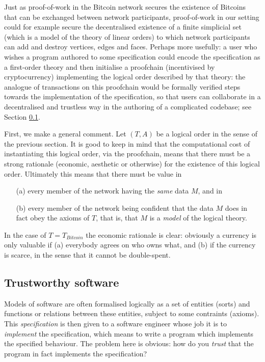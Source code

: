 \documentclass[english,letter paper,12pt,reqno]{article}
\theoremstyle{example}
\begin{document}
Just as proof-of-work in the Bitcoin network secures the existence of Bitcoins that can be exchanged between network participants, proof-of-work in our setting could for example secure the decentralised existence of a finite simplicial set (which is a model of the theory of linear orders) to which network participants can add and destroy vertices, edges and faces. Perhaps more usefully: a user who wishes a program authored to some specification could encode the specification as a first-order theory and then initialise a proofchain (incentivised by cryptocurrency) implementing the logical order described by that theory: the analogue of transactions on this proofchain would be formally verified steps towards the implementation of the specification, so that users can collaborate in a decentralised and trustless way in the authoring of a complicated codebase; see Section \ref{section:trustsoftware}.

First, we make a general comment. Let $(T, A)$ be a logical order in the sense of the previous section. It is good to keep in mind that the computational cost of instantiating this logical order, via the proofchain, means that there must be a strong rationale (economic, aesthetic or otherwise) for the existence of this logical order. Ultimately this means that there must be value in
\begin{itemize}
\item[(a)] every member of the network having the \emph{same} data $M$, and in
\item[(b)] every member of the network being confident that the data $M$ does in fact obey the axioms of $T$, that is, that $M$ is a \emph{model} of the logical theory.
\end{itemize}
In the case of $T = T_{Bitcoin}$ the economic rationale is clear: obviously a currency is only valuable if (a) everybody agrees on who owns what, and (b) if the currency is scarce, in the sense that it cannot be double-spent.

\subsection{Trustworthy software}\label{section:trustsoftware}

Models of software are often formalised logically as a set of entities (sorts) and functions or relations between these entities, subject to some contraints (axioms). This \emph{specification} is then given to a software engineer whose job it is to \emph{implement} the specification, which means to write a program which implements the specified behaviour. The problem here is obvious: how do you \emph{trust} that the program in fact implements the specification?
\end{document}
